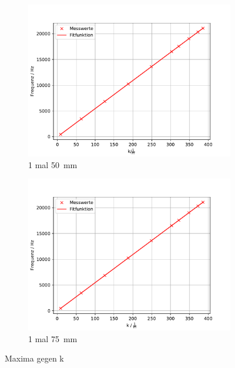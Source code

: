 \begin{figure}
 \centering
 \begin{subfigure}{0.48\textwidth}
  \centering
  \includegraphics[width=1\textwidth]{A6.pdf}
  \caption{1 mal \SI{50}{mm}}
  \label{fig.Aufgabe6}
 \end{subfigure}
 \begin{subfigure}{0.48\textwidth}
  \centering
  \includegraphics[width=1\textwidth]{A7.pdf}
  \caption{1 mal \SI{75}{mm}}
  \label{fig.Aufgabe7}
 \end{subfigure}
 \caption{Maxima gegen k}
\end{figure}

